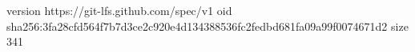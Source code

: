 version https://git-lfs.github.com/spec/v1
oid sha256:3fa28cfd564f7b7d3ce2c920e4d134388536fc2fedbd681fa09a99f0074671d2
size 341

